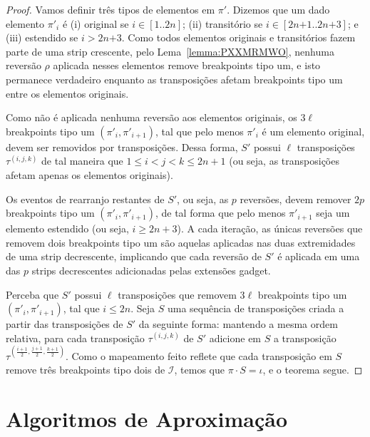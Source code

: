 \begin{proof}
Vamos definir três tipos de elementos em $\pi'$. Dizemos que um dado elemento $\pi'_i$ é (i) original se $i \in [1..2n]$; (ii) transitório se $i \in [2n{+1}..2n{+3}]$; e (iii) estendido se $i > 2n{+3}$. Como todos elementos originais e transitórios fazem parte de uma strip crescente, pelo Lema~\ref{lemma:PXXMRMWO}, nenhuma reversão $\rho$ aplicada nesses elementos remove breakpoints tipo um, e isto permanece verdadeiro enquanto as transposições afetam breakpoints tipo um entre os elementos originais.

Como não é aplicada nenhuma reversão aos elementos originais, os $3\ell$ breakpoints tipo um $(\pi'_i,\pi'_{i+1})$, tal que pelo menos $\pi'_i$ é um elemento original, devem ser removidos por transposições. Dessa forma, $S'$ possui $\ell$ transposições $\tau^{(i,j,k)}$ de tal maneira que $1 \le i < j < k \le 2n+1$ (ou seja, as transposições afetam apenas os elementos originais). 

Os eventos de rearranjo restantes de $S'$, ou seja, as $p$ reversões, devem remover $2p$ break\-points tipo um $(\pi'_i,\pi'_{i+1})$, de tal forma que pelo menos $\pi'_{i+1}$ seja um elemento estendido (ou seja, $i \ge 2n+3$). A cada iteração, as únicas reversões que removem dois breakpoints tipo um são aquelas aplicadas nas duas extremidades de uma strip decrescente, implicando que cada reversão de $S'$ é aplicada em uma das $p$ strips decrescentes adicionadas pelas extensões gadget.

Perceba que $S'$ possui $\ell$ transposições que removem $3\ell$ breakpoints tipo um $(\pi'_i,\pi'_{i+1})$, tal que $i \le 2n$. Seja $S$ uma sequência de transposições criada a partir das transposições de $S'$ da seguinte forma: mantendo a mesma ordem relativa, para cada transposição $\tau^{(i,j,k)}$ de $S'$ adicione em $S$ a transposição $\tau^{(\frac{i+1}{2},\frac{j+1}{2},\frac{k+1}{2})}$. Como o mapeamento feito reflete que cada transposição em $S$ remove três breakpoints tipo dois de $\mathcal{I}$, temos que $\pi \cdot S = \iota$, e o teorema segue.
\end{proof}



\section{Algoritmos de Aproximação}

